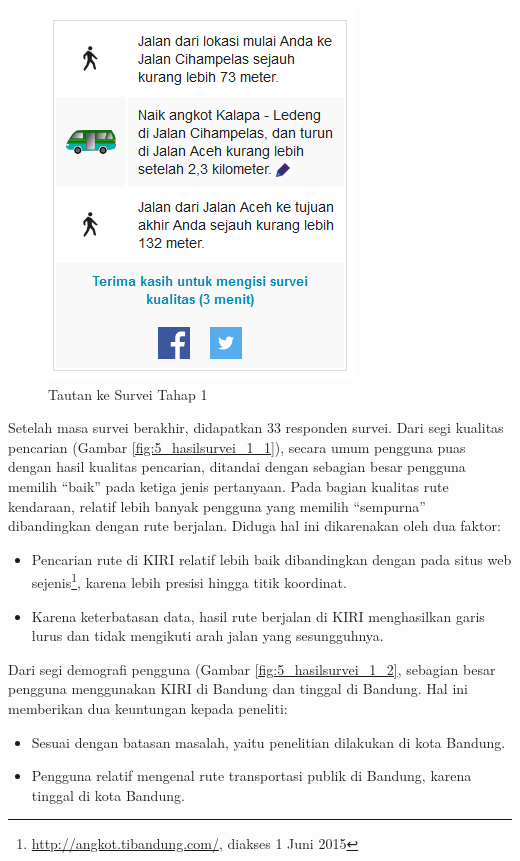 \begin{figure}
	\centering
	\includegraphics[scale=0.75]{Gambar/5_survei_1}
	\caption{Tautan ke Survei Tahap 1} 
	\label{fig:5_survei_1}
\end{figure}

Setelah masa survei berakhir, didapatkan 33 responden survei. Dari segi kualitas pencarian (Gambar \ref{fig:5_hasilsurvei_1_1}), secara umum pengguna puas dengan hasil kualitas pencarian, ditandai dengan sebagian besar pengguna memilih ``baik'' pada ketiga jenis pertanyaan. Pada bagian kualitas rute kendaraan, relatif lebih banyak pengguna yang memilih ``sempurna'' dibandingkan dengan rute berjalan. Diduga hal ini dikarenakan oleh dua faktor:

\begin{itemize}
	\item Pencarian rute di KIRI relatif lebih baik dibandingkan dengan pada situs web sejenis\footnote{\url{http://angkot.tibandung.com/}, diakses 1 Juni 2015}, karena lebih presisi hingga titik koordinat.
	\item Karena keterbatasan data, hasil rute berjalan di KIRI menghasilkan garis lurus dan tidak mengikuti arah jalan yang sesungguhnya.
\end{itemize}

Dari segi demografi pengguna (Gambar \ref{fig:5_hasilsurvei_1_2}, sebagian besar pengguna menggunakan KIRI di Bandung dan tinggal di Bandung. Hal ini memberikan dua keuntungan kepada peneliti:

\begin{itemize}
	\item Sesuai dengan batasan masalah, yaitu penelitian dilakukan di kota Bandung.
	\item Pengguna relatif mengenal rute transportasi publik di Bandung, karena tinggal di kota Bandung.
\end{itemize}

